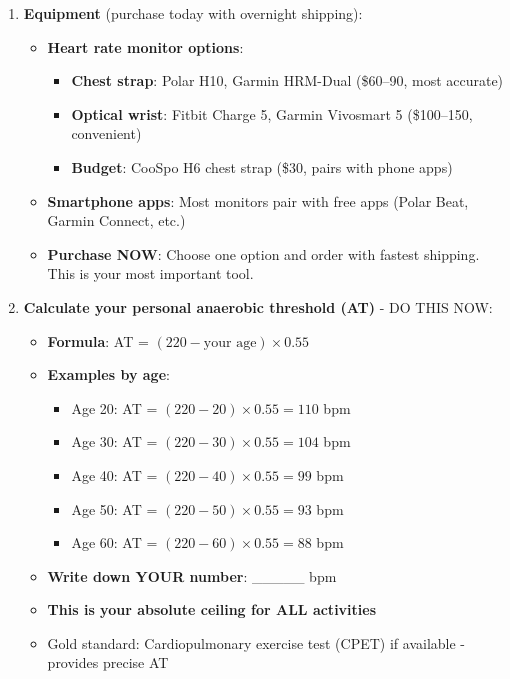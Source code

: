 \begin{enumerate}
    \item \textbf{Equipment} (purchase today with overnight shipping):
    \begin{itemize}
        \item \textbf{Heart rate monitor options}:
        \begin{itemize}
            \item \textbf{Chest strap}: Polar H10, Garmin HRM-Dual (\$60--90, most accurate)
            \item \textbf{Optical wrist}: Fitbit Charge 5, Garmin Vivosmart 5 (\$100--150, convenient)
            \item \textbf{Budget}: CooSpo H6 chest strap (\$30, pairs with phone apps)
        \end{itemize}
        \item \textbf{Smartphone apps}: Most monitors pair with free apps (Polar Beat, Garmin Connect, etc.)
        \item \textbf{Purchase NOW}: Choose one option and order with fastest shipping. This is your most important tool.
    \end{itemize}

    \item \textbf{Calculate your personal anaerobic threshold (AT)} - DO THIS NOW:
    \begin{itemize}
        \item \textbf{Formula}: AT = $(220 - \text{your age}) \times 0.55$
        \item \textbf{Examples by age}:
        \begin{itemize}
            \item Age 20: AT = $(220 - 20) \times 0.55 = 110$ bpm
            \item Age 30: AT = $(220 - 30) \times 0.55 = 104$ bpm
            \item Age 40: AT = $(220 - 40) \times 0.55 = 99$ bpm
            \item Age 50: AT = $(220 - 50) \times 0.55 = 93$ bpm
            \item Age 60: AT = $(220 - 60) \times 0.55 = 88$ bpm
        \end{itemize}
        \item \textbf{Write down YOUR number}: \_\_\_\_\_ bpm
        \item \textbf{This is your absolute ceiling for ALL activities}
        \item Gold standard: Cardiopulmonary exercise test (CPET) if available - provides precise AT
    \end{itemize}


\end{enumerate}
